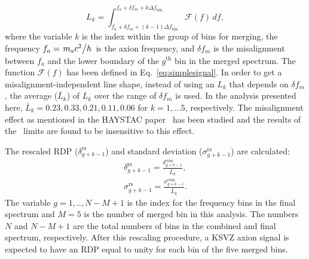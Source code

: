 \begin{equation}
  \label{eq:Lq_integral}
  L_{k} = \int_{f_a +\delta f_m + (k-1)\Delta f_\text{bin}}^{f_a +\delta f_m + k\Delta f_\text{bin}} \mathcal{F}(f) \,df,
\end{equation}
where the variable $k$ is the index within the group of bins for 
merging, the frequency $f_a=\left.m_a c^2\middle/h\right.$ is the axion
frequency, and $\delta f_m$ is the misalignment between $f_a$ and the lower
boundary of the $g^\text{th}$ bin in the merged spectrum.
The function $\mathcal{F}(f)$ has been defined in Eq.~\eqref{eq:simplesignal}.
In order to get a misalignment-independent line shape, instead of using an
$L_{k}$ that depends on $\delta f_m$, the average ($\bar{L}_{k}$) of
$L_{k}$ over the range of $\delta f_m$ is used.
In the analysis presented here, 
$\bar{L}_{k} = 0.23, 0.33, 0.21, 0.11, 0.06$ for $k = 1, ... 5$, respectively.
The misalignment effect as mentioned in the HAYSTAC paper~\cite{HAYSTACII}
has been studied and the results of the \gagg\ limits are found to be
insensitive to this effect.

The rescaled RDP ($\delta^\text{rs}_{g+k-1}$) and
standard deviation ($\sigma^\text{rs}_{g+k-1}$) are calculated:
\begin{equation}
  \label{eq:rescaled_delta_sigma_com}
  \begin{split}
  \delta^\text{rs}_{g+k-1} = \frac{\delta^\text{com}_{g+k-1}}{\bar{L}_{k}},\\
  \sigma^\text{rs}_{g+k-1} = \frac{\sigma^\text{com}_{g+k-1}}{\bar{L}_{k}}.
  \end{split}
\end{equation}
The variable $g = 1,..,N-M+1$ is the index for the frequency bins in the final 
spectrum and $M = 5$ is the number of merged bin in 
this analysis. The numbers $N$ and $N-M+1$ are the total numbers of bins in 
the combined and final spectrum, respectively. After this rescaling 
procedure, a KSVZ axion signal is expected to have an RDP equal to unity for 
each bin of the five merged bins.    

